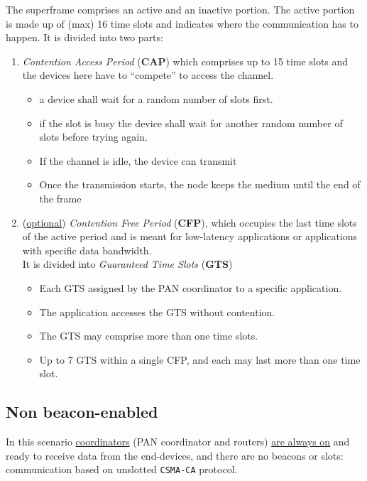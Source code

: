 The superframe comprises an active and an inactive portion. The active portion is made up of (max) 16 time slots and indicates where the communication has to happen.
It is divided into two parts:
\begin{enumerate}
   \item \textit{Contention Access Period} (\textbf{CAP})
   which comprises up to 15 time slots and the devices here have to ``compete'' to access the channel.
   \begin{itemize}
      \item a device shall wait for a random number of slots first.
      \item if the slot is busy the device shall wait for another random number of slots before
      trying again.
      \item If the channel is idle, the device can transmit
      \item Once the transmission starts, the node keeps the medium until the end of the frame
   \end{itemize}
   \item (\ul{optional}) \textit{Contention Free Period} (\textbf{CFP}), which occupies the last time slots of the active period and is meant for low-latency applications or applications with specific data bandwidth.\\
   It is divided into \textit{Guaranteed Time Slots} (\textbf{GTS})
   \begin{itemize}
      \item Each GTS assigned by the PAN coordinator to a specific application.
      \item The application accesses the GTS without contention.
      \item The GTS may comprise more than one time slots.
      \item Up to 7 GTS within a single CFP, and each may last more than one time slot.
   \end{itemize}
\end{enumerate}

\subsection{Non beacon-enabled}
In this scenario \ul{coordinators} (PAN coordinator and routers) \ul{are always on} and ready to receive data from the end-devices, and there are no beacons or slots: communication based on unslotted \texttt{CSMA-CA} protocol.

